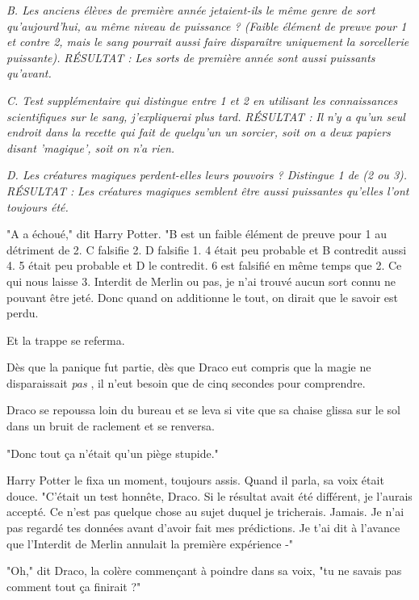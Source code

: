 \emph{B. Les anciens élèves de première année jetaient-ils le même genre de sort qu'aujourd'hui, au même niveau de puissance ? (Faible élément de preuve pour 1 et contre 2, mais le sang pourrait aussi faire disparaître uniquement la sorcellerie puissante). } \emph{\MakeUppercase{Résultat :}}  \emph{Les sorts de première année sont aussi puissants qu'avant.} 

\emph{C. Test supplémentaire qui distingue entre 1 et 2 en utilisant les connaissances scientifiques sur le sang, j'expliquerai plus tard. } \emph{\MakeUppercase{Résultat :}}  \emph{Il n'y a qu'un seul endroit dans la recette qui fait de quelqu'un un sorcier, soit on a deux papiers disant 'magique', soit on n'a rien.} 

\emph{D. Les créatures magiques perdent-elles leurs pouvoirs ? Distingue 1 de (2 ou 3). } \emph{\MakeUppercase{Résultat :}}  \emph{Les créatures magiques semblent être aussi puissantes qu'elles l'ont toujours été.} 

"A a échoué," dit Harry Potter. "B est un faible élément de preuve pour 1 au détriment de 2. C falsifie 2. D falsifie 1. 4 était peu probable et B contredit aussi 4. 5 était peu probable et D le contredit. 6 est falsifié en même temps que 2. Ce qui nous laisse 3. Interdit de Merlin ou pas, je n'ai trouvé aucun sort connu ne pouvant être jeté. Donc quand on additionne le tout, on dirait que le savoir est perdu.

Et la trappe se referma.

Dès que la panique fut partie, dès que Draco eut compris que la magie ne disparaissait \emph{pas} , il n'eut besoin que de cinq secondes pour comprendre.

Draco se repoussa loin du bureau et se leva si vite que sa chaise glissa sur le sol dans un bruit de raclement et se renversa.

"Donc tout ça n'était qu'un piège stupide."

Harry Potter le fixa un moment, toujours assis. Quand il parla, sa voix était douce. "C'était un test honnête, Draco. Si le résultat avait été différent, je l'aurais accepté. Ce n'est pas quelque chose au sujet duquel je tricherais. Jamais. Je n'ai pas regardé tes données avant d'avoir fait mes prédictions. Je t'ai dit à l'avance que l'Interdit de Merlin annulait la première expérience -"

"Oh," dit Draco, la colère commençant à poindre dans sa voix, "tu ne savais pas comment tout ça finirait ?"

